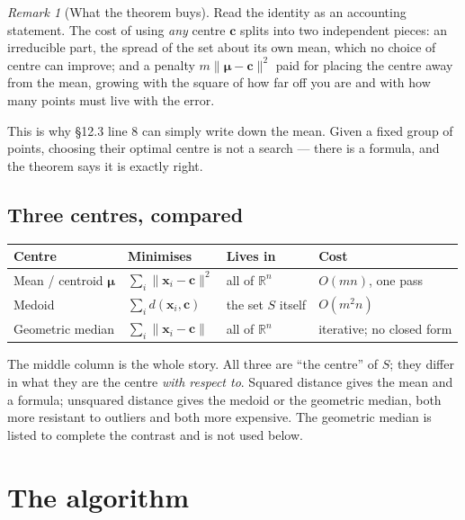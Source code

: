 \documentclass[11pt]{article}
\theoremstyle{plain}
\theoremstyle{definition}
\theoremstyle{remark}
\newtheorem*{rmk}{Remark}
\newcommand{\R}{\mathbb{R}}
\newcommand{\vc}[1]{\mathbf{#1}}
\newcommand{\norm}[1]{\lVert #1\rVert}
\newcommand{\bmu}{\boldsymbol{\mu}}
\begin{document}
\begin{rmk}[What the theorem buys]
Read the identity as an accounting statement. The cost of using \emph{any}
centre $\vc{c}$ splits into two independent pieces: an irreducible part, the
spread of the set about its own mean, which no choice of centre can improve; and
a penalty $m\norm{\bmu-\vc{c}}^{2}$ paid for placing the centre away from
the mean, growing with the square of how far off you are and with how many
points must live with the error.

This is why \S12.3 line 8 can simply write down the mean. Given a fixed group of
points, choosing their optimal centre is not a search --- there is a formula,
and the theorem says it is exactly right.
\end{rmk}

\subsection{Three centres, compared}
\begin{center}
\renewcommand{\arraystretch}{1.4}
\begin{tabular}{@{}l l l l@{}}
\toprule
\textbf{Centre} & \textbf{Minimises} & \textbf{Lives in} & \textbf{Cost} \\
\midrule
Mean / centroid $\bmu$
  & $\sum_i \norm{\vc{x}_i-\vc{c}}^{2}$ & all of $\R^{n}$
  & $O(mn)$, one pass \\
Medoid
  & $\sum_i d(\vc{x}_i,\vc{c})$         & the set $S$ itself
  & $O(m^{2}n)$ \\
Geometric median
  & $\sum_i \norm{\vc{x}_i-\vc{c}}$     & all of $\R^{n}$
  & iterative; no closed form \\
\bottomrule
\end{tabular}
\end{center}

\noindent The middle column is the whole story. All three are ``the centre'' of
$S$; they differ in what they are the centre \emph{with respect to}. Squared
distance gives the mean and a formula; unsquared distance gives the medoid or
the geometric median, both more resistant to outliers and both more expensive.
The geometric median is listed to complete the contrast and is not used below.

\section{The algorithm}
\end{document}
